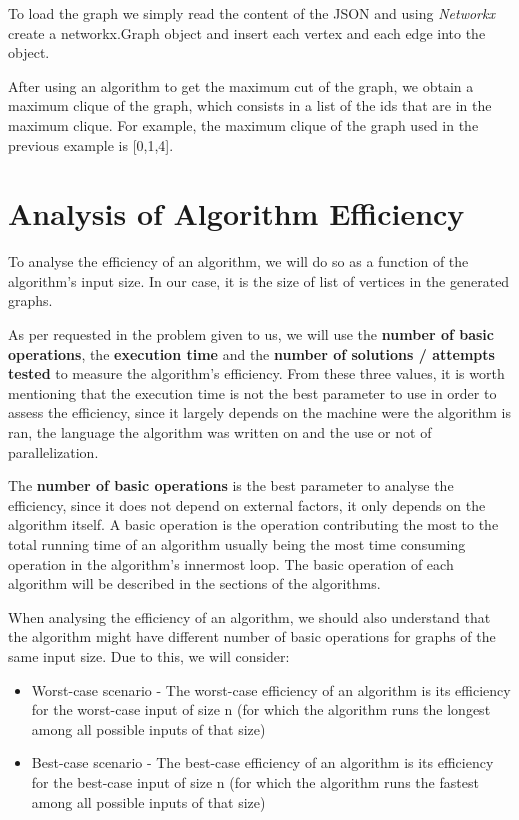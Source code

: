 \documentclass[]{revdetua}
\begin{document}
To load the graph we simply read the content of the JSON and using \textit{Networkx} create a networkx.Graph object and insert each vertex and each edge into the object.

After using an algorithm to get the maximum cut of the graph, we obtain a maximum clique of the graph, which consists in a list of the ids that are in the maximum clique. For example, the maximum clique of the graph used in the previous example is [0,1,4].

\section{Analysis of Algorithm Efficiency}

To analyse the efficiency of an algorithm, we will do so as a function of the algorithm's input size. In our case, it is the size of list of vertices in the generated graphs.

As per requested in the problem given to us, we will use the \textbf{number of basic operations}, the \textbf{execution time} and the \textbf{number of solutions / attempts tested} to measure the algorithm's efficiency. From these three values, it is worth mentioning that the execution time is not the best parameter to use in order to assess the efficiency, since it largely depends on the machine were the algorithm is ran, the language the algorithm was written on and the use or not of parallelization.

The \textbf{number of basic operations} is the best parameter to analyse the efficiency, since it does not depend on external factors, it only depends on the algorithm itself. A basic operation is the operation contributing the most to the total running time of an algorithm usually being the most time consuming operation in the algorithm's innermost loop. The basic operation of each algorithm will be described in the sections of the algorithms.

When analysing the efficiency of an algorithm, we should also understand that the algorithm might have different number of basic operations for graphs of the same input size. Due to this, we will consider:

\begin{itemize}
    \item Worst-case scenario - The worst-case efficiency of an algorithm is its efficiency for the worst-case input of size n (for which the algorithm runs the longest among all possible inputs of that size)
    \item Best-case scenario - The best-case efficiency of an algorithm is its efficiency for the best-case input of size n (for which the algorithm runs the fastest among all possible inputs of that size)
\end{itemize}
\end{document}
